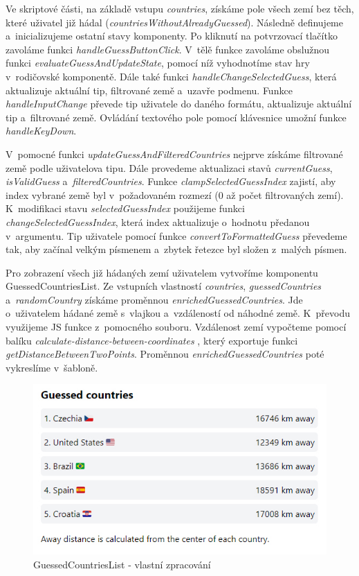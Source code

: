 Ve skriptové části, na základě vstupu \emph{countries}, získáme pole všech zemí bez těch, které uživatel již hádal (\emph{countriesWithoutAlreadyGuessed}). 
Následně definujeme a~inicializujeme ostatní stavy komponenty. Po kliknutí na potvrzovací tlačítko zavoláme funkci \emph{handleGuessButtonClick}. 
V~tělě funkce zavoláme obslužnou funkci \emph{evaluateGuessAndUpdateState}, pomocí níž vyhodnotíme stav hry v~rodičovské komponentě. 
Dále také funkci \emph{handleChangeSelectedGuess}, která aktualizuje aktuální tip, filtrované země a~uzavře podmenu. 
Funkce \emph{handleInputChange} převede tip uživatele do daného formátu, aktualizuje aktuální tip a~filtrované země. Ovládání textového pole pomocí klávesnice umožní funkce \emph{handleKeyDown}.

V~pomocné funkci \emph{updateGuessAndFilteredCountries} nejprve získáme filtrované země podle uživatelova tipu. Dále provedeme aktualizaci stavů \emph{currentGuess}, \emph{isValidGuess} a~\emph{filteredCountries}. 
Funkce \emph{clampSelectedGuessIndex} zajistí, aby index vybrané země byl v~požadovaném rozmezí (0 až počet filtrovaných zemí). 
K~modifikaci stavu \emph{selectedGuessIndex} použijeme funkci \emph{changeSelectedGuessIndex}, která index aktualizuje o~hodnotu předanou v~argumentu. 
Tip uživatele pomocí funkce \emph{convertToFormattedGuess} převedeme tak, aby začínal velkým písmenem a~zbytek řetezce byl složen z~malých písmen.

Pro zobrazení všech již hádaných zemí uživatelem vytvoříme komponentu GuessedCountriesList. 
Ze vstupních vlastností \emph{countries}, \emph{guessedCountries} a~\emph{randomCountry} získáme proměnnou \emph{enrichedGuessedCountries}. 
Jde o~uživatelem hádané země s~vlajkou a~vzdáleností od náhodné země. K~převodu využijeme JS funkce z~pomocného souboru. 
Vzdálenost zemí vypočteme pomocí balíku \emph{calculate-distance-between-coordinates} \cite{distancebetweencoordinates}, který exportuje funkci \emph{getDistanceBetweenTwoPoints}. 
Proměnnou \emph{enrichedGuessedCountries} poté vykreslíme v~šabloně.

\begin{figure}[htb]
	\centering
		\includegraphics[width=.7\textwidth]{images/GuessedCountriesList.jpg}
	\caption[GuessedCountriesList]{GuessedCountriesList - vlastní zpracování}
	\label{fig:svelteguessedcountrieslist}
\end{figure}

